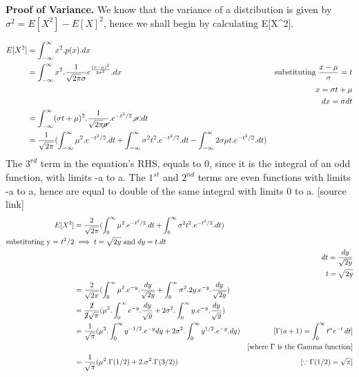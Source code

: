 \begin{Solution}
    \textbf{Proof of Variance.}
    We know that the variance of a distribution is given by $\sigma^2 = E[X^2] - E[X]^2$, hence we shall begin by calculating E[X^2].
    
    
    \begin{align*}
        E[X^2] &= \int_{-\infty}^{\infty}x^2.p(x).dx\\
        &= \int_{-\infty}^{\infty}x^2.\frac{1}{\sqrt{2\pi}\sigma}e^{\frac{(x-\mu)^2}{2\sigma^2}}.dx & \text{substituting }\frac{x-\mu}{\sigma} = t\\
        &&x = \sigma t + \mu \\
        &&dx = \sigma dt \\ 
        &= \int_{-\infty}^{\infty} (\sigma t + \mu)^2.\frac{1}{\sqrt{2\pi}\cancel{\sigma}}.e^{-t^2/2}.\cancel{\sigma}.dt\\
        &= \frac{1}{\sqrt{2\pi}}(\int_{-\infty}^{\infty}\mu^2.e^{-t^2/2}.dt + \int_{-\infty}^{\infty}\sigma^2t^2.e^{-t^2/2}.dt - \int_{-\infty}^{\infty}2\sigma\mu t.e^{-t^2/2}.dt)
    \end{align*}
    The $3^{rd}$ term in the equation's RHS, equals to 0, since it is the integral of an odd function, with limits -a to a. The $1^{st}$ and  $2^{nd}$ terms are even functions with limits -a to a, hence are equal to double of the same integral with limits 0 to a. [source link]
    \begin{align*}
        E[X^2] &= \frac{2}{\sqrt{2\pi}}(\int_{0}^{\infty}\mu^2.e^{-t^2/2}.dt + \int_{0}^{\infty}\sigma^2t^2.e^{-t^2/2}.dt)\\
        \text{substituting y = $t^2/2$}&\implies t = \sqrt{2y} \text{ and } dy = t.dt \\
        && dt = \frac{dy}{\sqrt{2y}}\\
        && t = \sqrt{2y}\\
        &= \frac{2}{\sqrt{2\pi}}(\int_{0}^{\infty}\mu^2.e^{-y}.\frac{dy}{\sqrt{2y}} + \int_{0}^{\infty}\sigma^2.2y.e^{-y}.\frac{dy}{\sqrt{2y}})\\
        &= \frac{\cancel{2}}{\cancel{2}\sqrt{\pi}}(\mu^2.\int_{0}^{\infty}e^{-y}.\frac{dy}{\sqrt{y}} + 2\sigma^2.\int_{0}^{\infty}y.e^{-y}.\frac{dy}{\sqrt{y}})\\
        &= \frac{1}{\sqrt{\pi}}(\mu^2.\int_{0}^{\infty}y^{-1/2}.e^{-y}dy + 2\sigma^2.\int_{0}^{\infty}y^{1/2}.e^{-y}.dy) &[\Gamma(a+1)=\int_0^{\infty}t^ae^{-t}\,dt]\\
        &&\text{[where $\Gamma$ is the Gamma function]}\\
        &= \frac{1}{\sqrt{\pi}} (\mu^2.\Gamma(1/2) + 2.\sigma^2.\Gamma(3/2)) &[\because \Gamma(1/2) = \sqrt{\pi}] \\

\end{align*}
\end{Solution}
